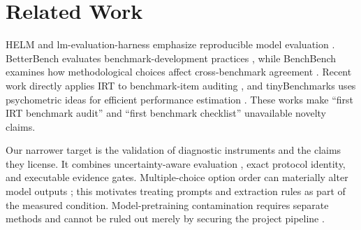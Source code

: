 \section{Related Work}

HELM and lm-evaluation-harness emphasize reproducible model evaluation
\citep{liang2022helm,gao2023lmevalharness}. BetterBench evaluates benchmark-development practices
\citep{reuel2024betterbench}, while BenchBench examines how methodological choices affect
cross-benchmark agreement \citep{perlitz2024benchbench}. Recent work directly applies IRT to
benchmark-item auditing \citep{land2026auditing}, and tinyBenchmarks uses psychometric ideas for
efficient performance estimation \citep{polo2024tinybenchmarks}. These works make ``first IRT
benchmark audit'' and ``first benchmark checklist'' unavailable novelty claims.

Our narrower target is the validation of diagnostic instruments and the claims they license. It
combines uncertainty-aware evaluation \citep{ye2024uncertainty}, exact protocol identity, and
executable evidence gates. Multiple-choice option order can materially alter model outputs
\citep{pezeshkpour2024optionorder}; this motivates treating prompts and extraction rules as part of
the measured condition. Model-pretraining contamination requires separate methods and cannot be
ruled out merely by securing the project pipeline \citep{oren2024contamination}.
